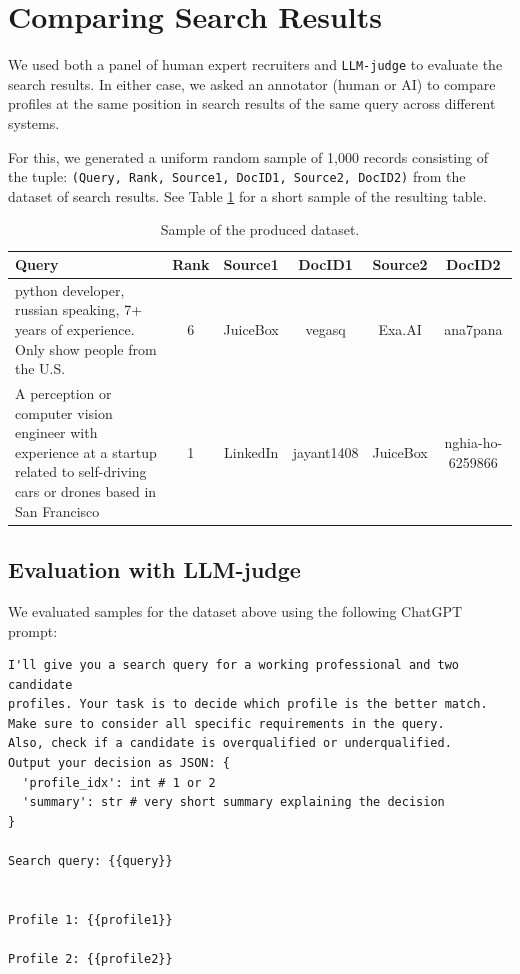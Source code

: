 \documentclass{article}
\begin{document}
\section{Comparing Search Results}

We used both a panel of human expert recruiters and \texttt{LLM-judge} \cite{zheng2023judging} to evaluate the search results. In either case, we asked an annotator (human or AI) to compare profiles at the same position in search results of the same query across different systems. 

For this, we generated a uniform random sample of 1,000 records consisting of the tuple: \texttt{(Query, Rank, Source1, DocID1, Source2, DocID2)} from the dataset of search results. See Table \ref{tab:dataset_sample} for a short sample of the resulting table. 

\begin{table}[h]
\centering
\begin{tabular}{|>{\raggedright\arraybackslash}p{4cm}|c|c|c|c|c|}
\hline
\textbf{Query} & \textbf{Rank} & \textbf{Source1} & \textbf{DocID1} & \textbf{Source2} & \textbf{DocID2} \\
\hline
python developer, russian speaking, 7+ years of experience. Only show people from the U.S. & 6 & JuiceBox & vegasq & Exa.AI & ana7pana\\
\hline
A perception or computer vision engineer with experience at a startup related to self-driving cars or drones based in San Francisco & 1 & LinkedIn & jayant1408 & JuiceBox & nghia-ho-6259866\\
\hline
\end{tabular}
\caption{Sample of the produced dataset.}
\label{tab:dataset_sample}
\end{table}





\subsection{Evaluation with LLM-judge}

We evaluated samples for the dataset above using the following ChatGPT prompt:

\begin{tcolorbox}[colback=gray!10, colframe=gray!80, title=Evaluation Prompt]
\begin{verbatim}
I'll give you a search query for a working professional and two candidate
profiles. Your task is to decide which profile is the better match.  
Make sure to consider all specific requirements in the query. 
Also, check if a candidate is overqualified or underqualified.
Output your decision as JSON: {
  'profile_idx': int # 1 or 2
  'summary': str # very short summary explaining the decision
}

Search query: {{query}}


Profile 1: {{profile1}}

Profile 2: {{profile2}}
\end{verbatim}
\end{tcolorbox}
\end{document}
